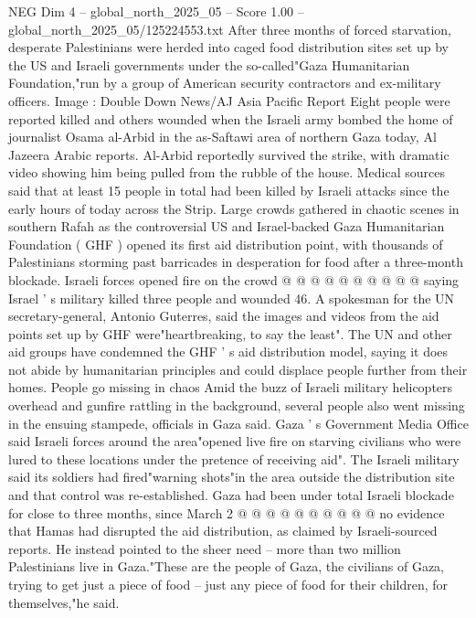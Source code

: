 \begin{textsample}{NEG Dim 4 – global\_north\_2025\_05 – Score 1.00 – global\_north\_2025\_05/125224553.txt}  \label{ex:f4_neg_267}
After three months of forced starvation, desperate Palestinians were herded into caged food distribution sites set up by the US and Israeli governments under the so-called"Gaza Humanitarian Foundation,"run by a group of American security contractors and ex-military officers.
Image : Double Down News/AJ Asia Pacific Report Eight people were reported killed and others wounded when the Israeli army bombed the home of journalist Osama al-Arbid in the as-Saftawi area of northern Gaza today, Al Jazeera Arabic reports.
Al-Arbid reportedly survived the strike, with dramatic video showing him being pulled from the rubble of the house.
Medical sources said that at least 15 people in total had been killed by Israeli attacks since the early hours of today across the Strip.
Large crowds gathered in chaotic scenes in southern Rafah as the controversial US and Israel-backed Gaza Humanitarian Foundation ( GHF ) opened its first aid distribution point, with thousands of Palestinians storming past barricades in desperation for food after a three-month blockade.
Israeli forces opened fire on the crowd @ @ @ @ @ @ @ @ @ @ saying Israel ' s military killed three people and wounded 46.
A spokesman for the UN secretary-general, Antonio Guterres, said the images and videos from the aid points set up by GHF were"heartbreaking, to say the least".
The UN and other aid groups have condemned the GHF ' s aid distribution model, saying it does not abide by humanitarian principles and could displace people further from their homes.
People go missing in chaos Amid the buzz of Israeli military helicopters overhead and gunfire rattling in the background, several people also went missing in the ensuing stampede, officials in Gaza said.
Gaza ' s Government Media Office said Israeli forces around the area"opened live fire on starving civilians who were lured to these locations under the pretence of receiving aid".
The Israeli military said its soldiers had fired"warning shots"in the area outside the distribution site and that control was re-established.
Gaza had been under total Israeli blockade for close to three months, since March 2 @ @ @ @ @ @ @ @ @ @ no evidence that Hamas had disrupted the aid distribution, as claimed by Israeli-sourced reports.
He instead pointed to the sheer need -- more than two million Palestinians live in Gaza."These are the people of Gaza, the civilians of Gaza, trying to get just a piece of food -- just any piece of food for their children, for themselves,"he said.

\end{textsample}
